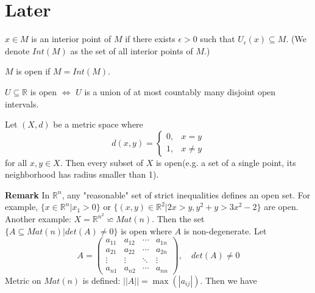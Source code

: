 \documentclass[main.tex]{subfiles}
\begin{document}
\pagestyle{plain}
\setcounter{chapter}{2}

\chapter{Later}
\label{chap:chapter1}

\begin{definition}
    $x\in M$ is an interior point of $M$ if there exists $\epsilon > 0$ such that $U_{\epsilon} (x) \subseteq M$. (We denote $Int(M)$ as the set of all interior points of $M$.)
\end{definition}

\begin{definition}
    $M$ is open if $M = Int(M)$. 
\end{definition}
\begin{theorem}
    $U \subseteq \mathbb{R}$ is open $\Longleftrightarrow$ $U$ is a union of at most countably many disjoint open intervals.
\end{theorem}
\begin{example}
    Let $(X, d)$ be a metric space where \[ d(x, y) = \begin{cases} 0, & x = y \\ 1, & x \ne y \end{cases} \] for all $x, y \in X$. Then every subset of $X$ is open(e.g. a set of a single point, its neighborhood has radius smaller than 1).
\end{example}
\par \noindent \textbf{Remark} In $\mathbb{R}^n$, any "reasonable" set of strict inequalities defines an open set. For example, $\{x\in \mathbb{R}^n| x_1 > 0\}$ or $\{(x, y)\in \mathbb{R}^2| 2x > y, y^2 + y > 3x^2 -2\}$ are open. Another example: $X = \mathbb{R}^{n^2} \backsimeq  Mat(n)$. Then the set $\{A \subseteq Mat(n)| det(A) \neq 0\}$ is open where $A$ is non-degenerate. Let 
\begin{equation}
    A = \begin{pmatrix}
        a_{11} & a_{12} & \cdots & a_{1n} \\
        a_{21} & a_{22} & \cdots & a_{2n} \\
        \vdots & \vdots & \ddots & \vdots \\
        a_{n1} & a_{n2} & \cdots & a_{nn}
    \end{pmatrix}, \quad det(A) \neq 0
\end{equation}
Metric on $Mat(n)$ is defined: $||A|| = \max(|a_{ij}|)$. Then we have 
\end{document}
